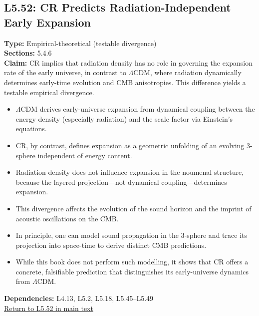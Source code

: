 \documentclass[12pt]{book}
\newcommand{\returnlink}[1]{\hyperref[logic:#1]{Return to #1 in main text}\xspace}
\begin{document}
\subsection*{L5.52: CR Predicts Radiation-Independent Early Expansion}
\label{appendix:L5.52}
\textbf{Type:} Empirical-theoretical (testable divergence)\\
\textbf{Sections:} 5.4.6 \\
\textbf{Claim:} CR implies that radiation density has no role in governing the expansion rate of the early universe, in contrast to $\Lambda$CDM, where radiation dynamically determines early-time evolution and CMB anisotropies. This difference yields a testable empirical divergence.
\begin{itemize}
  \item $\Lambda$CDM derives early-universe expansion from dynamical coupling between the energy density (especially radiation) and the scale factor via Einstein's equations.
  \item CR, by contrast, defines expansion as a geometric unfolding of an evolving 3-sphere independent of energy content.
  \item Radiation density does not influence expansion in the noumenal structure, because the layered projection---not dynamical coupling---determines expansion.
  \item This divergence affects the evolution of the sound horizon and the imprint of acoustic oscillations on the CMB.
  \item In principle, one can model sound propagation in the 3-sphere and trace its projection into space-time to derive distinct CMB predictions.
  \item While this book does not perform such modelling, it shows that CR offers a concrete, falsifiable prediction that distinguishes its early-universe dynamics from $\Lambda$CDM.
\end{itemize}
\textbf{Dependencies:} L4.13, L5.2, L5.18, L5.45–L5.49 \\
\returnlink{L5.52}
\end{document}
